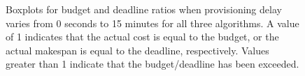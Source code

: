 \documentclass[conference]{IEEEtran}
\begin{document}
\begin{figure}[tb]
    \caption[Boxplots for budget and deadline ratios when provisioning delays occur]{Boxplots for budget and deadline ratios when provisioning delay varies from 0 seconds to 15 minutes for all three algorithms. A value of 1 indicates that the actual cost is equal to the budget, or the actual makespan is equal to the deadline, respectively. Values greater than 1 indicate that the budget/deadline has been exceeded.}
    \label{fig:delays}
\end{figure}
\end{document}
